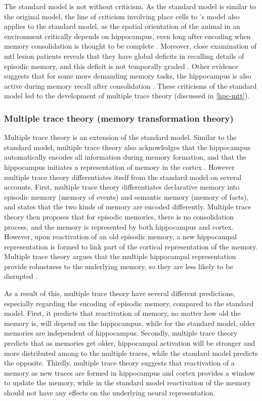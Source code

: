 The standard model is not without criticism. As the standard model is similar to the original \citet{marr71} model, the line of criticism involving place cells to \citet{marr71}'s model also applies to the standard model, as the spatial orientation of the animal in an environment critically depends on hippocampus, even long after encoding when memory consolidation is thought to be complete \citep[e.g.][]{mumby99, sutherland01, clark05}. Moreover, close examination of \gls{mtl} lesion patients reveals that they have global deficits in recalling details of episodic memory, and this deficit is not temporally graded \citep{cipolotti01, viskontas02}. Other evidence suggests that for some more demanding memory tasks, the hippocampus is also active during memory recall after consolidation \citep{ryan01, wheeler13}. These criticisms of the standard model led to the development of multiple trace theory (discussed in \ref{hpc-mtt}).

\subsubsection{Multiple trace theory (memory transformation theory) \label{hpc-mtt}}
Multiple trace theory is an extension of the standard model. Similar to the standard model,  multiple trace theory also acknowledges that the hippocampus automatically encodes all information during memory formation, and that the hippocampus initiates a representation of memory in the cortex \citep{nadel97}. However multiple trace theory differentiates itself from the standard model on several accounts. First, multiple trace theory differentiates declarative memory into episodic memory (memory of events) and semantic memory (memory of facts), and states that the two kinds of memory are encoded differently. Multiple trace theory then proposes that for episodic memories, there is no consolidation process, and the memory is represented by both hippocampus and cortex. However, upon reactivation of an old episodic memory, a new hippocampal representation is formed to link part of the cortical representation of the memory. Multiple trace theory argues that the multiple hippocampal representation provide robustness to the underlying memory, so they are less likely to be disrupted \citep{nadel97}. 

As a result of this, multiple trace theory have several different predictions, especially regarding the encoding of episodic memory, compared to the standard model. First, it predicts that reactivation of memory, no matter how old the memory is, will depend on the hippocampus, while for the standard model, older memories are independent of hippocampus. Secondly, multiple trace theory predicts that as memories get older, hippocampal activation will be stronger and more distributed among to the multiple traces, while the standard model predicts the opposite. Thirdly, multiple trace theory suggests that reactivation of a memory as new traces are formed in hippocampus and cortex provides a window to update the memory, while in the standard model reactivation of the memory should not have any effects on the underlying neural representation. 

